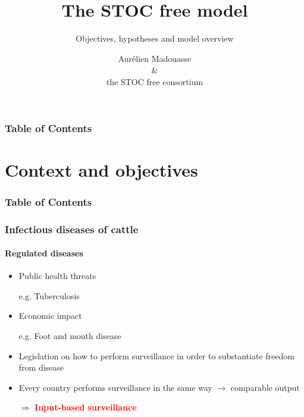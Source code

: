 \documentclass{beamer}
\title{The STOC free model}
\subtitle{Objectives, hypotheses and model overview}
\author[Madouasse \textit{et al.}]{Aurélien Madouasse \texorpdfstring{\\}{}\& \texorpdfstring{\\}{}the STOC free consortium}
\institute{\url{https://www.stocfree.eu/}}
\begin{document}
{
  \maketitle
}

\begin{frame}
\frametitle{Table of Contents}
  \tableofcontents
\end{frame}  

\section{Context and objectives}

\begin{frame}
\frametitle{Table of Contents}
  \tableofcontents[currentsection]
\end{frame}  


\begin{frame}
\frametitle{Infectious diseases of cattle}
\framesubtitle{Regulated diseases}
\begin{itemize}
  \item{Public health threats}
  \item[]{\scriptsize e.g. Tuberculosis}
  \item{Economic impact}
  \item[]{\scriptsize e.g. Foot and mouth disease}
  \item{Legislation on how to perform surveillance in order to substantiate freedom from disease}
  \item{Every country performs surveillance in the same way $\rightarrow$ comparable output}
  \item[$\Rightarrow$]{\textcolor{red}{\textbf{Input-based surveillance}}}
 \end{itemize}
\end{frame}
\end{document}
